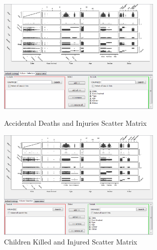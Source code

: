 \documentclass[12pt, a4paper]{article}
\begin{document}
\begin{figure}[H]
\centering
\includegraphics[width=0.7\textwidth]{visualisation_scatterMatrix_accidentalDI.png}
\caption{Accidental Deaths and Injuries Scatter Matrix}\hspace{0.5cm} \break
\includegraphics[width=0.7\textwidth]{visualisation_scatterMatrix_childrenKI.png}
\caption{Children Killed and Injured Scatter Matrix}
\end{figure}
\end{document}
